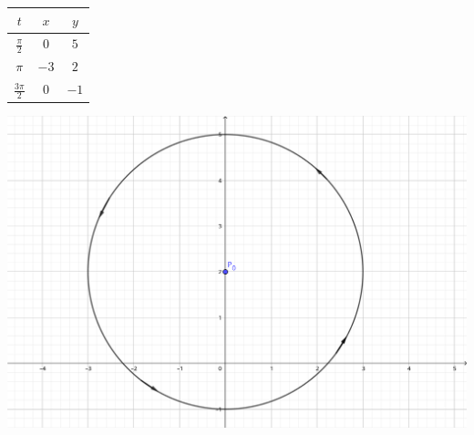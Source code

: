 \documentclass[../practica_02.tex]{subfiles}
\begin{document}
\begin{enumerate}
            \begin{tabular}{ c|c|c } 
                \hline
                    $t$                 & $x$  & $y$ \\
                \hline
                    $\frac{\pi}{2}$     & $0 $ & $5 $ \\ 
                    $\pi$               & $-3$ & $2 $ \\ 
                    $\frac{3\pi}{2}$    & $0 $ & $-1$ \\ 
                \hline
            \end{tabular}

            \includegraphics[scale=0.4]{ej02/resources/ej02c.png} $ $
    \end{enumerate}
\end{document}
